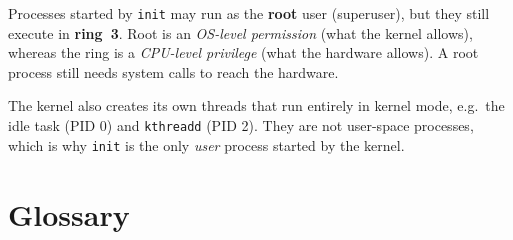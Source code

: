 \documentclass{article}
\begin{document}
\begin{pitfall}
	Processes started by \texttt{init} may run as the \textbf{root} user (superuser), but they still execute in \textbf{ring~3}. Root is an \emph{OS-level permission} (what the kernel allows), whereas the ring is a \emph{CPU-level privilege} (what the hardware allows). A root process still needs system calls to reach the hardware.
\end{pitfall}

\begin{extra}
	The kernel also creates its own threads that run entirely in kernel mode, e.g.\ the idle task (PID 0) and \texttt{kthreadd} (PID 2). They are not user-space processes, which is why \texttt{init} is the only \emph{user} process started by the kernel.
\end{extra}

\appendix
\section{Glossary}
\end{document}
